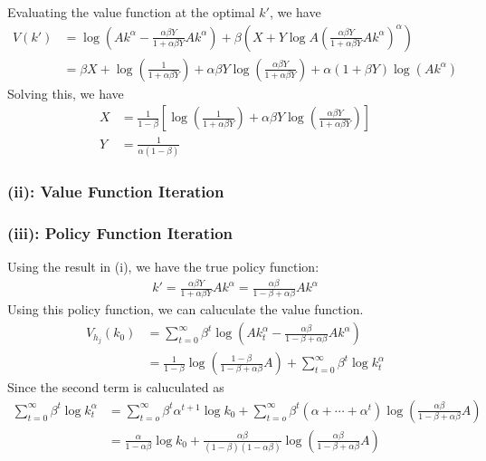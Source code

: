 \documentclass{ltjsarticle}
\begin{document}
Evaluating the value function at the optimal $k'$, we have
\begin{align*}
    V(k') 
    &= \log \left( A k^\alpha - \frac{\alpha \beta Y}{1 + \alpha \beta Y} A k^\alpha \right) + \beta (X + Y \log A \left( \frac{\alpha \beta Y}{1 + \alpha \beta Y} A k^\alpha \right)^\alpha) \\
    &= \beta X + \log \left( \frac{1}{1+\alpha \beta Y} \right) + \alpha \beta Y \log \left( \frac{\alpha \beta Y}{1+\alpha \beta Y}\right) + \alpha (1 + \beta Y) \log \left( A k^\alpha \right) 
\end{align*}
Solving this, we have
\begin{align*}
    X &= \frac{1}{1-\beta} \left[ \log \left( \frac{1}{1+\alpha \beta Y} \right) +  \alpha \beta Y \log \left( \frac{\alpha \beta Y}{1+\alpha \beta Y}\right)  \right] \\
    Y &= \frac{1}{\alpha (1-\beta)} 
\end{align*}

\subsubsection*{(ii): Value Function Iteration}


\subsubsection*{(iii): Policy Function Iteration}
Using the result in (i), we have the true policy function:
\begin{gather*}
    k' = \frac{\alpha \beta Y}{1 + \alpha \beta Y} A k^\alpha = \frac{\alpha \beta}{1-\beta + \alpha \beta} A k^\alpha
\end{gather*}
Using this policy function, we can caluculate the value function.
\begin{align*}
    V_{h_j}(k_0) 
    &= \sum_{t=0}^{\infty} \beta^t \log \left(A k_t^\alpha - \frac{\alpha \beta}{1-\beta + \alpha \beta} A k^\alpha \right) \\
    &= \frac{1}{1-\beta} \log \left( \frac{1-\beta}{1-\beta + \alpha \beta} A \right) + \sum_{t=0}^{\infty} \beta^t \log k_t^\alpha
\end{align*}
Since the second term is caluculated as
\begin{align*}
    \sum_{t=0}^{\infty} \beta^t \log k_t^\alpha
    &= \sum_{t=o}^{\infty} \beta^t \alpha^{t+1} \log k_0 + \sum_{t=o}^{\infty} \beta^t (\alpha + \cdots + \alpha^t) \log \left(\frac{\alpha \beta}{1 - \beta + \alpha \beta} A \right) \\
    &= \frac{\alpha}{1 - \alpha \beta} \log k_0 + \frac{\alpha \beta}{(1-\beta)(1-\alpha \beta)} \log \left(\frac{\alpha \beta}{1 - \beta + \alpha \beta} A \right) 
\end{align*}
\end{document}

